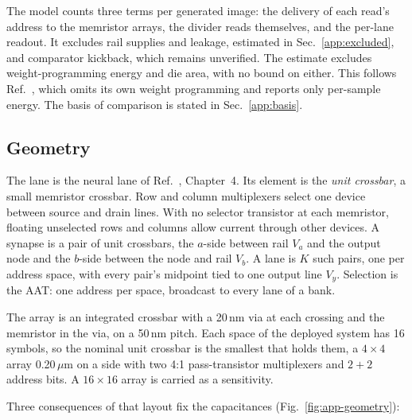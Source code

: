 \documentclass[reprint,amsmath,amssymb,aps,nofootinbib]{revtex4-2}
\begin{document}
The model counts three terms per generated image: the delivery of
each read's address to the memristor arrays, the divider reads
themselves, and the per-lane readout. It excludes rail supplies and leakage, estimated in
Sec.~\ref{app:excluded}, and comparator kickback, which remains
unverified. The estimate excludes weight-programming energy and die area, with no
bound on either. This follows Ref.~\cite{jelincic2025dtm}, which omits
its own weight programming and reports only per-sample energy. The
basis of comparison is stated in Sec.~\ref{app:basis}.

\subsection{Geometry}\label{app:geometry}

The lane is the neural lane of Ref.~\cite{knowm2026blog}, Chapter~4. Its element is the \emph{unit crossbar}, a small memristor crossbar. Row
and column multiplexers select one device between source and drain
lines. With no selector transistor at each memristor, floating
unselected rows and columns allow current through other devices. A synapse
is a pair of unit crossbars, the $a$-side between rail $V_a$ and the
output node and the $b$-side between the node and rail $V_b$. A lane is
$K$ such pairs, one per address space, with every pair's midpoint tied
to one output line $V_y$. Selection is the AAT: one address per space,
broadcast to every lane of a bank.

The array is an integrated crossbar with a 20\,nm via at each crossing
and the memristor in the via, on a 50\,nm pitch. Each space of the
deployed system has 16 symbols, so the nominal unit crossbar is the
smallest that holds them, a $4 \times 4$ array 0.20\,$\mu$m on a side
with two 4:1 pass-transistor multiplexers and $2 + 2$ address bits. A
$16 \times 16$ array is carried as a sensitivity.

Three consequences of that layout fix the capacitances
(Fig.~\ref{fig:app-geometry}):
\end{document}
